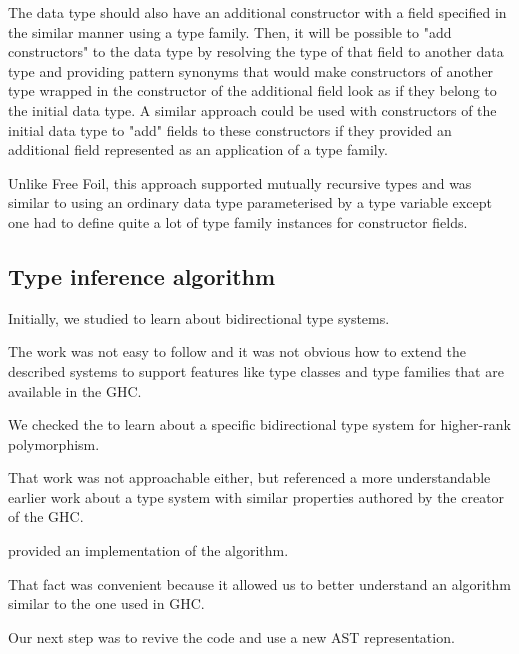 The data type should also have an additional constructor with a field specified in the similar manner using a type family. Then, it will be possible to "add constructors" to the data type by resolving the type of that field to another data type and providing pattern synonyms that would make constructors of another type wrapped in the constructor of the additional field look as if they belong to the initial data type. A similar approach could be used with constructors of the initial data type to "add" fields to these constructors if they provided an additional field represented as an application of a type family.

Unlike Free Foil, this approach supported mutually recursive types and was similar to using an ordinary data type parameterised by a type variable except one had to define quite a lot of type family instances for constructor fields.

\subsection{Type inference algorithm}
\label{sec:TypeInferenceAlgorithm}


Initially, we studied \cite{dunfield-bidirectional-2020} to learn about bidirectional type systems.

The work was not easy to follow and it was not obvious how to extend the described systems to support features like type classes and type families that are available in the GHC.

We checked the \cite{dunfield-complete-2020} to learn about a specific bidirectional type system for higher-rank polymorphism.

That work was not approachable either, but referenced a more understandable earlier work about a type system with similar properties \cite{jones-practical-2007} authored by the creator of the GHC.

\cite{jones-practical-2007} provided an implementation of the algorithm.

That fact was convenient because it allowed us to better understand an algorithm similar to the one used in GHC.

Our next step was to revive the code and use a new AST representation.